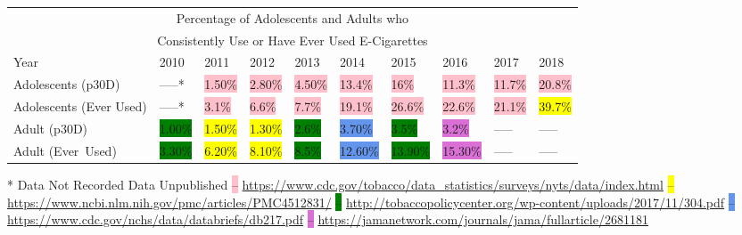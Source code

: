 \begin{center}
    \begin{tabular}{p{1in} p{0.45in} p{0.45in} p{0.45in} p{0.45in} p{0.45in} p{0.45in} p{0.45in} p{0.45in} p{0.45in}}
        \toprule
        \multicolumn{10}{c}{Percentage of Adolescents and Adults who}\\
        \multicolumn{10}{c}{Consistently Use or Have Ever Used E-Cigarettes}\\    
        \midrule
        Year & 2010 & 2011 & 2012 & 2013 & 2014 & 2015 & 2016 & 2017 & 2018 \\
        \midrule
        Adolescents (p30D) & -----* & \colorbox{pink}{1.50\%} & \colorbox{pink}{2.80\%} & \colorbox{pink}{4.50\%} & \colorbox{pink}{13.4\%} & \colorbox{pink}{16\%} & \colorbox{pink}{11.3\%} & \colorbox{pink}{11.7\%} & \colorbox{pink}{20.8\%} \\
        Adolescents (Ever Used) & -----* & \colorbox{pink}{3.1\%} & \colorbox{pink}{6.6\%} & \colorbox{pink}{7.7\%} & \colorbox{pink}{19.1\%} & \colorbox{pink}{26.6\%}  & \colorbox{pink}{22.6\%} & \colorbox{pink}{21.1\%} & \colorbox{yellow}{39.7\%} \\
        Adult (p30D) & \colorbox{green}{1.00\%} & \colorbox{yellow}{1.50\%} & \colorbox{yellow}{1.30\%} & \colorbox{green}{2.6\%} & \colorbox{CornflowerBlue}{3.70\%} & \colorbox{green}{3.5\%} & \colorbox{Orchid}{3.2\%} & -----\textdagger{} & -----\textdagger{} \\
        Adult (Ever~Used) & \colorbox{green}{3.30\%} & \colorbox{yellow}{6.20\%} & \colorbox{yellow}{8.10\%} & \colorbox{green}{8.5\%} & \colorbox{CornflowerBlue}{12.60\%} & \colorbox{green}{13.90\%}  & \colorbox{Orchid}{15.30\%} & -----\textdagger{} & -----\textdagger{} \\
        \bottomrule
    \end{tabular}
\end{center}
%
* Data Not Recorded
\newline
\textdagger{} Data Unpublished
\newline
\colorbox{pink}{--} \url{https://www.cdc.gov/tobacco/data_statistics/surveys/nyts/data/index.html}
\newline
\colorbox{yellow}{--} \url{https://www.ncbi.nlm.nih.gov/pmc/articles/PMC4512831/}
\newline
\colorbox{green}{--} \url{http://tobaccopolicycenter.org/wp-content/uploads/2017/11/304.pdf}
\newline
\colorbox{CornflowerBlue}{--} \url{https://www.cdc.gov/nchs/data/databriefs/db217.pdf}
\newline
\colorbox{Orchid}{--} \url{https://jamanetwork.com/journals/jama/fullarticle/2681181}

